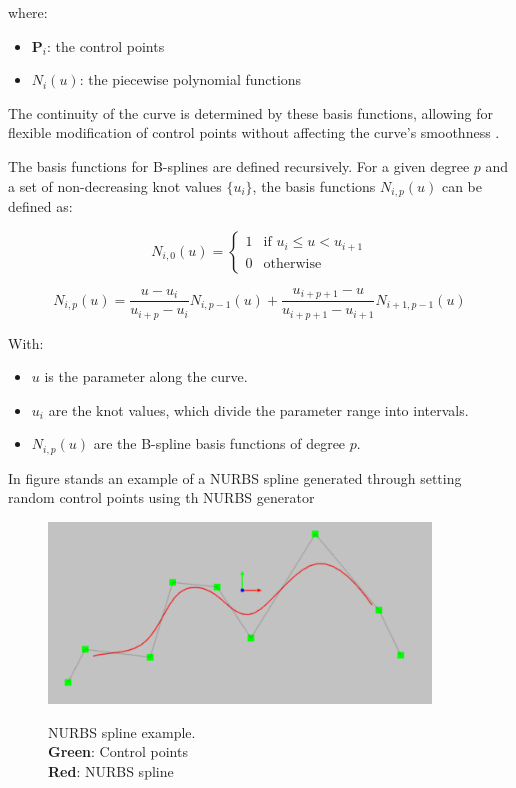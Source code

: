 where:
\begin{itemize}
    \item \( \mathbf{P}_i \): the control points
    \item \( N_i(u) \): the piecewise polynomial functions
\end{itemize}
The continuity of the curve is determined by these basis functions, allowing for flexible modification of 
control points without affecting the curve's smoothness \cite{R29}.

The basis functions for B-splines are defined recursively. For a given degree \( p \) and a set of non-decreasing knot values 
\( \{ u_i \} \), the basis functions \( N_{i,p}(u) \) can be defined as:

\begin{equation}
    N_{i,0}(u) = 
\begin{cases} 
1 & \text{if } u_i \leq u < u_{i+1} \\
0 & \text{otherwise}
\end{cases}
\end{equation}

\begin{equation}
N_{i,p}(u) = \frac{u - u_i}{u_{i+p} - u_i} N_{i,p-1}(u) + \frac{u_{i+p+1} - u}{u_{i+p+1} - u_{i+1}} N_{i+1,p-1}(u)
\end{equation}


With:
\begin{itemize}
    \item \( u \) is the parameter along the curve.
    \item \( u_i \) are the knot values, which divide the parameter range into intervals.
    \item \( N_{i,p}(u) \) are the B-spline basis functions of degree \( p \).
\end{itemize}

In figure  stands an example of a NURBS spline generated through setting random 
control points using th NURBS generator \cite{R32}

\begin{figure}[H]
    \begin{center}
    \includegraphics[width=4in]{images/Chap1/control-spline.png}\\
    \caption{NURBS spline example.\\
    \textbf{Green}: Control points\\
    \textbf{Red}: NURBS spline}
    \label{NURBS} 
    \end{center}
\end{figure}

